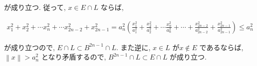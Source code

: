 \documentclass[10pt, fleqn, label-section=none]{bxjsarticle}
\theoremstyle{definition}
\newcommand{\norm}[1]{\left\|#1\right\|}
\renewcommand{\;}{\, ; \,}
\begin{document}
が成り立つ. 従って, $x \in E \cap L$ ならば, 

\begin{align*} x_1^2 + x_2^2 + \cdots x_n^2 + \cdots  x_{2n-2}^2 + x_{2n-1}^2 = a_n^2 ( \frac{x_1^2}{a_1^2} + \frac{x_2^2}{a_2^2} + \cdots \frac{x_n^2}{a_n^2} + \cdots + \frac{x_{2n-2}^2}{a_{2n-2}^2 } + \frac{x_{2n-1}^2}{a_{2n-1}^2 }  )  \leq a_n^2\end{align*}

が成り立つので, $E \cap L \subset B^{2n-1} \cap L$. また逆に, $x \in L$ が$x \notin E$ であるならば, $\norm x > a_n^2$ となり矛盾するので, $ B^{2n-1}\cap L \subset E \cap L$ が成り立つ.  
\end{document}
